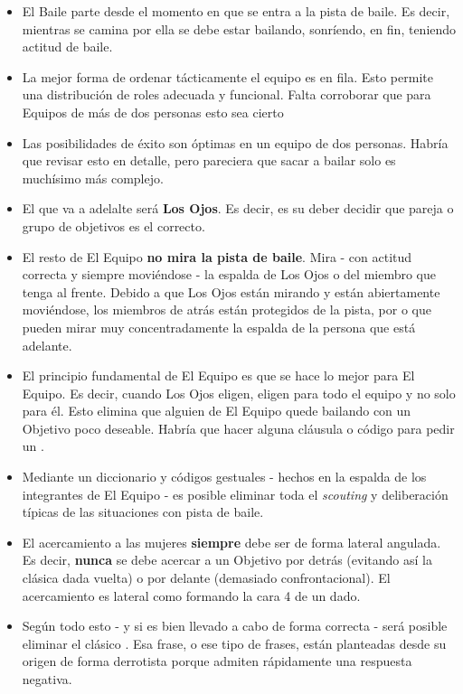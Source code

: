 \documentclass{article}
\begin{document}
\begin{itemize}
\item El Baile parte desde el momento en que se entra a la pista de baile. Es decir, mientras se camina por ella se debe estar bailando, sonríendo, en fin, teniendo actitud de baile.
\item La mejor forma de ordenar tácticamente el equipo es en fila. Esto permite una distribución de roles adecuada y funcional. {\color{red} Falta corroborar que para Equipos de más de dos personas esto sea cierto}
\item Las posibilidades de éxito son óptimas en un equipo de dos personas. {\color{red} Habría que revisar esto en detalle, pero pareciera que sacar a bailar solo es muchísimo más complejo}.
\item El que va a adelalte será \textbf{Los Ojos}. Es decir, es su deber decidir que pareja o grupo de objetivos es el correcto.
\item El resto de El Equipo \textbf{no mira la pista de baile}. Mira - con actitud correcta y siempre moviéndose - la espalda de Los Ojos o del miembro que tenga al frente. Debido a que Los Ojos están mirando y están abiertamente moviéndose, los miembros de atrás están protegidos de la pista, por o que pueden mirar muy concentradamente la espalda de la persona que está adelante.
\item El principio fundamental de El Equipo es que se hace lo mejor para El Equipo. Es decir, cuando Los Ojos eligen, eligen para todo el equipo y no solo para él. Esto elimina que alguien de El Equipo quede bailando con un Objetivo poco deseable. {\color{red} Habría que hacer alguna cláusula o código para pedir un }.
\item Mediante un diccionario y códigos gestuales - hechos en la espalda de los integrantes de El Equipo - es posible eliminar toda el \textit{scouting} y deliberación típicas de las situaciones con pista de baile.
\item El acercamiento a las mujeres \textbf{siempre} debe ser de forma lateral angulada. Es decir, \textbf{nunca} se debe acercar a un Objetivo por detrás (evitando así la clásica dada vuelta) o por delante (demasiado confrontacional). El acercamiento es lateral como formando la cara 4 de un dado.
\item Según todo esto - y si es bien llevado a cabo de forma correcta - será posible eliminar el clásico . Esa frase, o ese tipo de frases, están planteadas desde su origen de forma derrotista porque admiten rápidamente una respuesta negativa. 
\end{itemize} 
\end{document}
